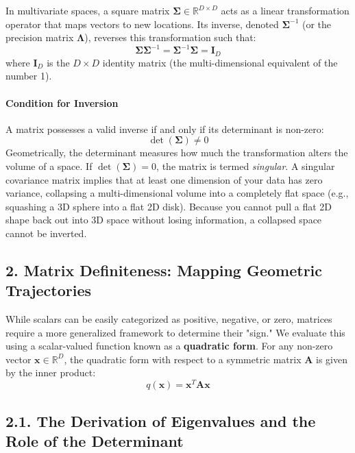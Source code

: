 \documentclass{article}
\begin{document}
In multivariate spaces, a square matrix $\boldsymbol{\Sigma} \in \mathbb{R}^{D \times D}$ acts as a linear transformation operator that maps vectors to new locations. Its inverse, denoted $\boldsymbol{\Sigma}^{-1}$ (or the precision matrix $\boldsymbol{\Lambda}$), reverses this transformation such that:
\begin{equation*}
\boldsymbol{\Sigma} \boldsymbol{\Sigma}^{-1} = \boldsymbol{\Sigma}^{-1} \boldsymbol{\Sigma} = \mathbf{I}_D
\end{equation*}
where $\mathbf{I}_D$ is the $D \times D$ identity matrix (the multi-dimensional equivalent of the number 1).

\paragraph{Condition for Inversion}
A matrix possesses a valid inverse if and only if its determinant is non-zero:
\begin{equation*}
\det(\boldsymbol{\Sigma}) \neq 0
\end{equation*}
Geometrically, the determinant measures how much the transformation alters the volume of a space. If $\det(\boldsymbol{\Sigma}) = 0$, the matrix is termed \textit{singular}. A singular covariance matrix implies that at least one dimension of your data has zero variance, collapsing a multi-dimensional volume into a completely flat space (e.g., squashing a 3D sphere into a flat 2D disk). Because you cannot pull a flat 2D shape back out into 3D space without losing information, a collapsed space cannot be inverted.

\subsection*{2. Matrix Definiteness: Mapping Geometric Trajectories}
While scalars can be easily categorized as positive, negative, or zero, matrices require a more generalized framework to determine their "sign." We evaluate this using a scalar-valued function known as a \textbf{quadratic form}. For any non-zero vector $\mathbf{x} \in \mathbb{R}^D$, the quadratic form with respect to a symmetric matrix $\mathbf{A}$ is given by the inner product:
\begin{equation*}
q(\mathbf{x}) = \mathbf{x}^T \mathbf{A} \mathbf{x}
\end{equation*}

\subsection*{2.1. The Derivation of Eigenvalues and the Role of the Determinant}
\end{document}
